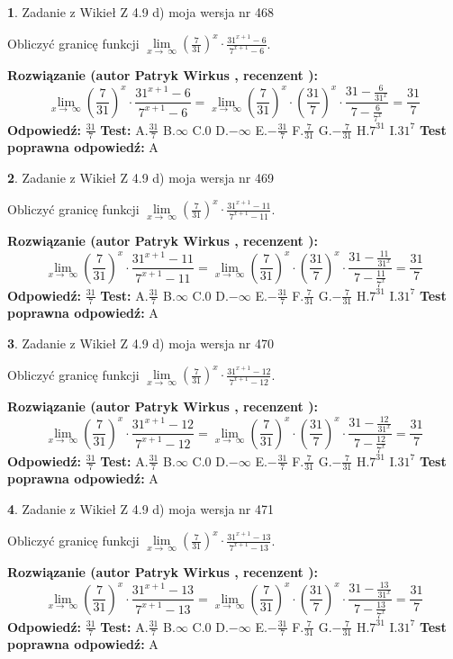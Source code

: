 \documentclass[12pt, a4paper]{article}
\theoremstyle{definition} %
\newtheorem{zad}{}
\newcommand{\zadStart}[1]{\begin{zad}#1\newline}
\newcommand{\zadStop}{\end{zad}}
\newcommand{\rozwStart}[2]{\noindent \textbf{Rozwiązanie (autor #1 , recenzent #2): }\newline}
\newcommand{\rozwStop}{\newline}
\newcommand{\odpStart}{\noindent \textbf{Odpowiedź:}\newline}
\newcommand{\odpStop}{\newline}
\newcommand{\testStart}{\noindent \textbf{Test:}\newline}
\newcommand{\testStop}{\newline}
\newcommand{\kluczStart}{\noindent \textbf{Test poprawna odpowiedź:}\newline}
\newcommand{\kluczStop}{\newline}
\begin{document}
\zadStart{Zadanie z Wikieł Z 4.9 d) moja wersja nr 468}


Obliczyć granicę funkcji  $\lim\limits_{x\to\ \infty}(\frac{7}{31})^{x}\cdot\frac{31^{x+1}-6}{7^{x+1}-6}$.
\zadStop
\rozwStart{Patryk Wirkus}{}
$$\lim\limits_{x\to\ \infty}(\frac{7}{31})^{x}\cdot\frac{31^{x+1}-6}{7^{x+1}-6}=\lim\limits_{x\to\ \infty}(\frac{7}{31})^{x}\cdot(\frac{31}{7})^{x} \cdot \frac{31-\frac{6}{31^{x}}}{7-\frac{6}{7^{x}}} = \frac{31}{7}$$
\rozwStop
\odpStart
$\frac{31}{7}$
\odpStop
\testStart
A.$\frac{31}{7}$ B.$\infty$ C.$0$ D.$-\infty$ E.$-\frac{31}{7}$
F.$\frac{7}{31}$ G.$-\frac{7}{31}$
H.$7^{31}$
I.$31^{7}$
\testStop
\kluczStart
A
\kluczStop



\zadStart{Zadanie z Wikieł Z 4.9 d) moja wersja nr 469}


Obliczyć granicę funkcji  $\lim\limits_{x\to\ \infty}(\frac{7}{31})^{x}\cdot\frac{31^{x+1}-11}{7^{x+1}-11}$.
\zadStop
\rozwStart{Patryk Wirkus}{}
$$\lim\limits_{x\to\ \infty}(\frac{7}{31})^{x}\cdot\frac{31^{x+1}-11}{7^{x+1}-11}=\lim\limits_{x\to\ \infty}(\frac{7}{31})^{x}\cdot(\frac{31}{7})^{x} \cdot \frac{31-\frac{11}{31^{x}}}{7-\frac{11}{7^{x}}} = \frac{31}{7}$$
\rozwStop
\odpStart
$\frac{31}{7}$
\odpStop
\testStart
A.$\frac{31}{7}$ B.$\infty$ C.$0$ D.$-\infty$ E.$-\frac{31}{7}$
F.$\frac{7}{31}$ G.$-\frac{7}{31}$
H.$7^{31}$
I.$31^{7}$
\testStop
\kluczStart
A
\kluczStop



\zadStart{Zadanie z Wikieł Z 4.9 d) moja wersja nr 470}


Obliczyć granicę funkcji  $\lim\limits_{x\to\ \infty}(\frac{7}{31})^{x}\cdot\frac{31^{x+1}-12}{7^{x+1}-12}$.
\zadStop
\rozwStart{Patryk Wirkus}{}
$$\lim\limits_{x\to\ \infty}(\frac{7}{31})^{x}\cdot\frac{31^{x+1}-12}{7^{x+1}-12}=\lim\limits_{x\to\ \infty}(\frac{7}{31})^{x}\cdot(\frac{31}{7})^{x} \cdot \frac{31-\frac{12}{31^{x}}}{7-\frac{12}{7^{x}}} = \frac{31}{7}$$
\rozwStop
\odpStart
$\frac{31}{7}$
\odpStop
\testStart
A.$\frac{31}{7}$ B.$\infty$ C.$0$ D.$-\infty$ E.$-\frac{31}{7}$
F.$\frac{7}{31}$ G.$-\frac{7}{31}$
H.$7^{31}$
I.$31^{7}$
\testStop
\kluczStart
A
\kluczStop



\zadStart{Zadanie z Wikieł Z 4.9 d) moja wersja nr 471}


Obliczyć granicę funkcji  $\lim\limits_{x\to\ \infty}(\frac{7}{31})^{x}\cdot\frac{31^{x+1}-13}{7^{x+1}-13}$.
\zadStop
\rozwStart{Patryk Wirkus}{}
$$\lim\limits_{x\to\ \infty}(\frac{7}{31})^{x}\cdot\frac{31^{x+1}-13}{7^{x+1}-13}=\lim\limits_{x\to\ \infty}(\frac{7}{31})^{x}\cdot(\frac{31}{7})^{x} \cdot \frac{31-\frac{13}{31^{x}}}{7-\frac{13}{7^{x}}} = \frac{31}{7}$$
\rozwStop
\odpStart
$\frac{31}{7}$
\odpStop
\testStart
A.$\frac{31}{7}$ B.$\infty$ C.$0$ D.$-\infty$ E.$-\frac{31}{7}$
F.$\frac{7}{31}$ G.$-\frac{7}{31}$
H.$7^{31}$
I.$31^{7}$
\testStop
\kluczStart
A
\kluczStop
\end{document}
